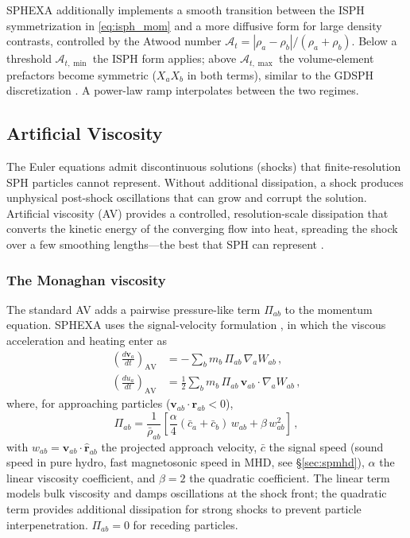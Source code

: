 SPHEXA additionally implements a smooth transition between the ISPH symmetrization in \eqref{eq:isph_mom} and a more diffusive form for large density contrasts, controlled by the Atwood number $\mathcal{A}_t = |\rho_a - \rho_b|/(\rho_a + \rho_b)$. Below a threshold $\mathcal{A}_{t,\min}$ the ISPH form applies; above $\mathcal{A}_{t,\max}$ the volume-element prefactors become symmetric ($X_a X_b$ in both terms), similar to the GDSPH discretization \cite{Wissing2020}. A power-law ramp interpolates between the two regimes.



\subsection{Artificial Viscosity}
\label{sec:av}

The Euler equations admit discontinuous solutions (shocks) that finite-resolution SPH particles cannot represent. Without additional dissipation, a shock produces unphysical post-shock oscillations that can grow and corrupt the solution. Artificial viscosity (AV) provides a controlled, resolution-scale dissipation that converts the kinetic energy of the converging flow into heat, spreading the shock over a few smoothing lengths---the best that SPH can represent \cite{Rosswog2009}.


\subsubsection*{The Monaghan viscosity}

The standard AV adds a pairwise pressure-like term $\Pi_{ab}$ to the momentum equation. SPHEXA uses the signal-velocity formulation \cite{Rosswog2009}, in which the viscous acceleration and heating enter as
\begin{align}
    \left(\frac{d\mathbf{v}_a}{dt}\right)_\mathrm{AV} &= -\sum_b m_b \, \Pi_{ab} \, \nabla_a W_{ab}\,, \label{eq:av_mom} \\[3pt]
    \left(\frac{du_a}{dt}\right)_\mathrm{AV} &= \frac{1}{2} \sum_b m_b \, \Pi_{ab} \, \mathbf{v}_{ab} \cdot \nabla_a W_{ab}\,, \label{eq:av_energy}
\end{align}
where, for approaching particles ($\mathbf{v}_{ab} \cdot \mathbf{r}_{ab} < 0$),
\begin{equation}
    \Pi_{ab} = \frac{1}{\bar{\rho}_{ab}} \left[\frac{\alpha}{4}(\bar{c}_a + \bar{c}_b)\, w_{ab} + \beta \, w_{ab}^2 \right]\,,
    \label{eq:av_Pi}
\end{equation}
with $w_{ab} = \mathbf{v}_{ab} \cdot \hat{\mathbf{r}}_{ab}$ the projected approach velocity, $\bar{c}$ the signal speed (sound speed in pure hydro, fast magnetosonic speed in MHD, see \S\ref{sec:spmhd}), $\alpha$ the linear viscosity coefficient, and $\beta = 2$ the quadratic coefficient. The linear term models bulk viscosity and damps oscillations at the shock front; the quadratic term provides additional dissipation for strong shocks to prevent particle interpenetration. $\Pi_{ab} = 0$ for receding particles.

